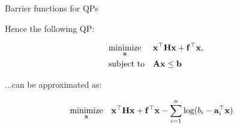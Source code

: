 \documentclass{beamer}
\begin{document}
\begin{frame}{Barrier functions for QPs}
\begin{flushleft}

Hence the following QP:

\begin{equation}
\begin{aligned}
& \underset{\mathbf{x}}{\text{minimize}}
& & \mathbf{x}^\top \mathbf{H} \mathbf{x} + \mathbf{f}^\top \mathbf{x}, \\
& \text{subject to}
& & 
\mathbf{A}\mathbf{x} \leq \mathbf{b}
\end{aligned}
\end{equation}
 
...can be approximated as:

\begin{equation}
\begin{aligned}
& \underset{\mathbf{x}}{\text{minimize}}
& & \mathbf{x}^\top \mathbf{H} \mathbf{x} + \mathbf{f}^\top \mathbf{x} - \sum\limits_{i = 1}^n \text{log} (b_i - \mathbf{a}_i^\top \mathbf{x})
\end{aligned}
\end{equation}
 
\end{flushleft}
\end{frame}
\end{document}
